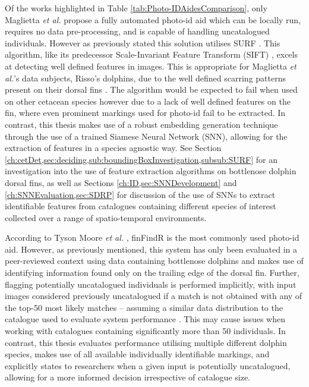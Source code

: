 Of the works highlighted in Table \ref{tab:Photo-IDAidesComparison}, only Maglietta \textit{et al.} propose a fully automated photo-id aid which can be locally run, requires no data pre-processing, and is capable of handling uncatalogued individuals. However as previously stated this solution utilises SURF \cite{bay_speeded-up_2008}. This algorithm, like its predecessor Scale-Invariant Feature Transform (SIFT) \cite{lowe_object_1999}, excels at detecting well defined features in images. This is appropriate for Maglietta \textit{et al.}'s data subjects, Risso's dolphins, due to the well defined scarring patterns present on their dorsal fins \cite{mariani_analysis_2016}. The algorithm would be expected to fail when used on other cetacean species however due to a lack of well defined features on the fin, where even prominent markings used for photo-id fail to be extracted. In contrast, this thesis makes use of a robust embedding generation technique through the use of a trained Siamese Neural Network (SNN), allowing for the extraction of features in a species agnostic way. See Section \ref{ch:cetDet,sec:deciding,sub:boundingBoxInvestigation,subsub:SURF} for an investigation into the use of feature extraction algorithms on bottlenose dolphin dorsal fins, as well as Sections \ref{ch:ID,sec:SNNDevelopment} and \ref{ch:SNNEvaluation,sec:SDRP} for discussion of the use of SNNs to extract identifiable features from catalogues containing different species of interest collected over a range of spatio-temporal environments. 
 
According to Tyson Moore \textit{et al.} \cite{tyson_moore_rise_2022}, finFindR is the most commonly used photo-id aid. However, as previously mentioned, this system has only been evaluated in a peer-reviewed context using data containing bottlenose dolphins and makes use of identifying information found only on the trailing edge of the dorsal fin. Further, flagging potentially uncatalogued individuals is performed implicitly, with input images considered previously uncatalogued if a match is not obtained with any of the top-50 most likely matches -- assuming a similar data distribution to the catalogue used to evaluate system performance \cite{thompson_finfindr_2022}. This may cause issues when working with catalogues containing significantly more than 50 individuals. In contrast, this thesis evaluates performance utilising multiple different dolphin species, makes use of all available individually identifiable markings, and explicitly states to researchers when a given input is potentially uncatalogued, allowing for a more informed decision irrespective of catalogue size.


